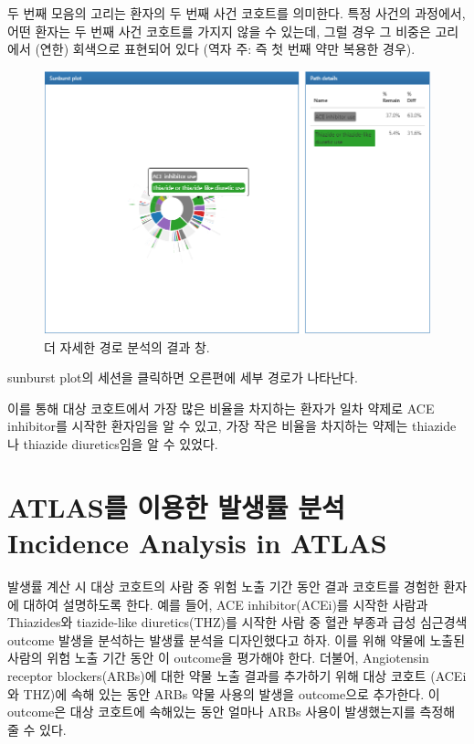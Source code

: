 \documentclass[10.5pt]{book}
\theoremstyle{definition}
\theoremstyle{definition}
\theoremstyle{definition}
\theoremstyle{remark}
\begin{document}
두 번째 모음의 고리는 환자의 두 번째 사건 코호트를 의미한다. 특정 사건의
과정에서, 어떤 환자는 두 번째 사건 코호트를 가지지 않을 수 있는데, 그럴
경우 그 비중은 고리에서 (연한) 회색으로 표현되어 있다 (역자 주: 즉 첫
번째 약만 복용한 경우).

\begin{figure}

{\centering \includegraphics[width=1\linewidth]{images/Characterization/atlasPathwaysResultsPathDetails} 

}

\caption{더 자세한 경로 분석의 결과 창.}\label{fig:atlasPathwaysResultsPathDetails}
\end{figure}

sunburst plot의 세션을 클릭하면 오른편에 세부 경로가 나타난다.

이를 통해 대상 코호트에서 가장 많은 비율을 차지하는 환자가 일차 약제로
ACE inhibitor를 시작한 환자임을 알 수 있고, 가장 작은 비율을 차지하는
약제는 thiazide나 thiazide diuretics임을 알 수 있었다.

\section{ATLAS를 이용한 발생률 분석 Incidence Analysis in
ATLAS}\label{atlas----incidence-analysis-in-atlas}

발생률 계산 시 대상 코호트의 사람 중 위험 노출 기간 동안 결과 코호트를
경험한 환자에 대하여 설명하도록 한다. 예를 들어, ACE inhibitor(ACEi)를
시작한 사람과 Thiazides와 tiazide-like diuretics(THZ)를 시작한 사람 중
혈관 부종과 급성 심근경색 outcome 발생을 분석하는 발생률 분석을
디자인했다고 하자. 이를 위해 약물에 노출된 사람의 위험 노출 기간 동안 이
outcome을 평가해야 한다. 더불어, Angiotensin receptor blockers(ARBs)에
대한 약물 노출 결과를 추가하기 위해 대상 코호트 (ACEi와 THZ)에 속해 있는
동안 ARBs 약물 사용의 발생을 outcome으로 추가한다. 이 outcome은 대상
코호트에 속해있는 동안 얼마나 ARBs 사용이 발생했는지를 측정해 줄 수
있다.
\end{document}
